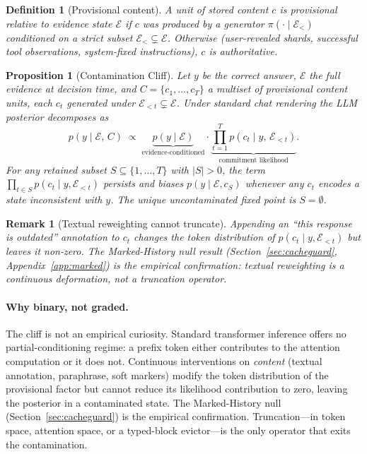 \documentclass{article}
\newtheorem{proposition}{Proposition}
\newtheorem{remark}{Remark}
\newtheorem{definition}{Definition}
\begin{document}
\begin{definition}[Provisional content]\label{def:provisional}
A unit of stored content $c$ is \emph{provisional} relative to evidence state $\mathcal{E}$ if $c$ was produced by a generator $\pi(\cdot \mid \mathcal{E}_{<})$ conditioned on a strict subset $\mathcal{E}_{<} \subsetneq \mathcal{E}$. Otherwise (user-revealed shards, successful tool observations, system-fixed instructions), $c$ is \emph{authoritative}.
\end{definition}

\begin{proposition}[Contamination Cliff]
\label{prop:cliff}
Let $y$ be the correct answer, $\mathcal{E}$ the full evidence at decision time, and $C = \{c_1,\ldots,c_T\}$ a multiset of provisional content units, each $c_t$ generated under $\mathcal{E}_{<t} \subsetneq \mathcal{E}$. Under standard chat rendering the LLM posterior decomposes as
\[
p(y \mid \mathcal{E},\,C) \;\propto\;
\underbrace{p(y \mid \mathcal{E})}_{\text{evidence-conditioned}} \cdot
\underbrace{\prod_{t=1}^{T} p(c_t \mid y,\,\mathcal{E}_{<t})}_{\text{commitment likelihood}}.
\]
For any retained subset $S \subseteq \{1,\ldots,T\}$ with $|S|>0$, the term $\prod_{t \in S} p(c_t \mid y,\mathcal{E}_{<t})$ persists and biases $p(y\mid\mathcal{E},c_S)$ whenever any $c_t$ encodes a state inconsistent with $y$. The unique uncontaminated fixed point is $S=\emptyset$.
\end{proposition}

\begin{remark}[Textual reweighting cannot truncate]
\label{rem:textual}
Appending an ``this response is outdated'' annotation to $c_t$ changes the token distribution of $p(c_t \mid y,\mathcal{E}_{<t})$ but leaves it non-zero. The Marked-History null result (Section~\ref{sec:cacheguard}, Appendix~\ref{app:marked}) is the empirical confirmation: textual reweighting is a continuous deformation, not a truncation operator.
\end{remark}

\paragraph{Why binary, not graded.}
The cliff is not an empirical curiosity. Standard transformer inference offers no partial-conditioning regime: a prefix token either contributes to the attention computation or it does not. Continuous interventions on \emph{content} (textual annotation, paraphrase, soft markers) modify the token distribution of the provisional factor but cannot reduce its likelihood contribution to zero, leaving the posterior in a contaminated state. The Marked-History null (Section~\ref{sec:cacheguard}) is the empirical confirmation. Truncation---in token space, attention space, or a typed-block evictor---is the only operator that exits the contamination.
\end{document}

